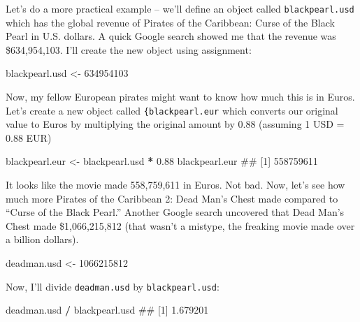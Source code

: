 \documentclass[]{book}
\newenvironment{Shaded}{\begin{snugshade}}{\end{snugshade}}
\newcommand{\DecValTok}[1]{\textcolor[rgb]{0.00,0.00,0.81}{#1}}
\newcommand{\FloatTok}[1]{\textcolor[rgb]{0.00,0.00,0.81}{#1}}
\newcommand{\StringTok}[1]{\textcolor[rgb]{0.31,0.60,0.02}{#1}}
\newcommand{\OperatorTok}[1]{\textcolor[rgb]{0.81,0.36,0.00}{\textbf{#1}}}
\newcommand{\NormalTok}[1]{#1}
\theoremstyle{definition}
\theoremstyle{definition}
\theoremstyle{remark}
\begin{document}
Let's do a more practical example -- we'll define an object called
\texttt{blackpearl.usd} which has the global revenue of Pirates of the
Caribbean: Curse of the Black Pearl in U.S. dollars. A quick Google
search showed me that the revenue was \$634,954,103. I'll create the new
object using assignment:

\begin{Shaded}
\begin{Highlighting}[]
\NormalTok{blackpearl.usd <-}\StringTok{ }\DecValTok{634954103}
\end{Highlighting}
\end{Shaded}

Now, my fellow European pirates might want to know how much this is in
Euros. Let's create a new object called \texttt{\{blackpearl.eur} which
converts our original value to Euros by multiplying the original amount
by 0.88 (assuming 1 USD = 0.88 EUR)

\begin{Shaded}
\begin{Highlighting}[]
\NormalTok{blackpearl.eur <-}\StringTok{ }\NormalTok{blackpearl.usd }\OperatorTok{*}\StringTok{ }\FloatTok{0.88}
\NormalTok{blackpearl.eur}
\NormalTok{## [1] 558759611}
\end{Highlighting}
\end{Shaded}

It looks like the movie made 558,759,611 in Euros. Not bad. Now, let's
see how much more Pirates of the Caribbean 2: Dead Man's Chest made
compared to ``Curse of the Black Pearl.'' Another Google search
uncovered that Dead Man's Chest made \$1,066,215,812 (that wasn't a
mistype, the freaking movie made over a billion dollars).

\begin{Shaded}
\begin{Highlighting}[]
\NormalTok{deadman.usd <-}\StringTok{ }\DecValTok{1066215812}
\end{Highlighting}
\end{Shaded}

Now, I'll divide \texttt{deadman.usd} by \texttt{blackpearl.usd}:

\begin{Shaded}
\begin{Highlighting}[]
\NormalTok{deadman.usd }\OperatorTok{/}\StringTok{ }\NormalTok{blackpearl.usd}
\NormalTok{## [1] 1.679201}
\end{Highlighting}
\end{Shaded}
\end{document}
